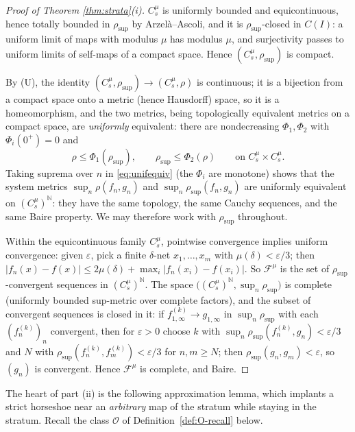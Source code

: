 \documentclass[11pt]{article}
\newcommand{\I}{I}
\newcommand{\rsup}{\rho_{\sup}}
\begin{document}
\begin{proof}[Proof of Theorem \ref{thm:strata}(i)]
$C^\mu_s$ is uniformly bounded and equicontinuous, hence totally bounded in
$\rsup$ by Arzel\`a--Ascoli, and it is $\rsup$-closed in $C(\I)$: a uniform limit
of maps with modulus $\mu$ has modulus $\mu$, and surjectivity passes to uniform
limits of self-maps of a compact space.  Hence $(C^\mu_s,\rsup)$ is compact.

By (U), the identity $(C^\mu_s,\rsup)\to(C^\mu_s,\rho)$ is continuous; it is a
bijection from a compact space onto a metric (hence Hausdorff) space, so it is a
homeomorphism, and the two metrics, being topologically equivalent metrics on a
compact space, are \emph{uniformly} equivalent: there are nondecreasing
$\Phi_1,\Phi_2$ with $\Phi_i(0^+)=0$ and
\begin{equation}\label{eq:unifequiv}
\rho\le\Phi_1(\rsup),
\qquad
\rsup\le\Phi_2(\rho)
\qquad\text{on }C^\mu_s\times C^\mu_s .
\end{equation}
Taking suprema over $n$ in \eqref{eq:unifequiv} (the $\Phi_i$ are monotone) shows
that the system metrics $\sup_n\rho(f_n,g_n)$ and $\sup_n\rsup(f_n,g_n)$ are
uniformly equivalent on $(C^\mu_s)^{\mathbb N}$: they have the same topology, the
same Cauchy sequences, and the same Baire property.  We may therefore work with
$\rsup$ throughout.

Within the equicontinuous family $C^\mu_s$, pointwise convergence implies uniform
convergence: given $\varepsilon$, pick a finite $\delta$-net $x_1,\dots,x_m$ with
$\mu(\delta)<\varepsilon/3$; then
$|f_n(x)-f(x)|\le2\mu(\delta)+\max_i|f_n(x_i)-f(x_i)|$.  So $\mathcal F^\mu$ is
the set of $\rsup$-convergent sequences in $(C^\mu_s)^{\mathbb N}$.  The space
$\bigl((C^\mu_s)^{\mathbb N},\sup_n\rsup\bigr)$ is complete (uniformly bounded
sup-metric over complete factors), and the subset of convergent sequences is
closed in it: if $f^{(k)}_{1,\infty}\to g_{1,\infty}$ in $\sup_n\rsup$ with each
$(f^{(k)}_n)_n$ convergent, then for $\varepsilon>0$ choose $k$ with
$\sup_n\rsup(f^{(k)}_n,g_n)<\varepsilon/3$ and $N$ with
$\rsup(f^{(k)}_n,f^{(k)}_m)<\varepsilon/3$ for $n,m\ge N$; then
$\rsup(g_n,g_m)<\varepsilon$, so $(g_n)$ is convergent.  Hence
$\mathcal F^\mu$ is complete, and Baire.
\end{proof}

The heart of part (ii) is the following approximation lemma, which implants a
strict horseshoe near an \emph{arbitrary} map of the stratum while staying in the
stratum.  Recall the class $\mathcal O$ of Definition~\ref{def:O-recall} below.
\end{document}
